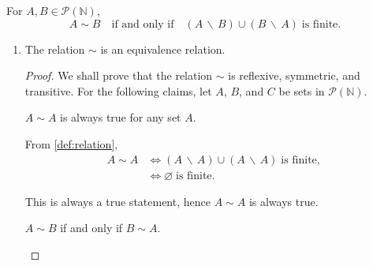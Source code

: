 \begin{enumerate}
        \smallskip

        \begin{definition} \label{def:relation}
            For $A, B \in \mathcal{P}(\mathbb{N})$,
            \[ A \sim B \quad \text{if and only if} \quad (A \, \backslash \, B) \cup (B \, \backslash \, A) \; \text{is finite}. \]
        \end{definition}

        \bigskip

        \begin{enumerate}

            \item
                \begin{proposition} \label{prop:3-a}
                    The relation $\sim$ is an equivalence relation.
                \end{proposition}

                \medskip

                \begin{proof}
                    We shall prove that the relation $\sim$ is reflexive, symmetric, and transitive.
                    For the following claims, let $A$, $B$, and $C$ be sets in $\mathcal{P}(\mathbb{N})$.

                    \begin{claim}
                        $A \sim A$ is always true for any set $A$.
                    \end{claim}

                    \medskip

                    \begin{subproof}
                        From \cref{def:relation},
                        \begin{align*}
                            A \sim A &\Longleftrightarrow (A \, \backslash \, A) \cup (A \, \backslash \, A) \; \text{is finite}, \\
                            &\Longleftrightarrow \varnothing \; \text{is finite}.
                        \end{align*}

                        This is always a true statement, hence $A \sim A$ is always true.
                    \end{subproof}

                    \medskip

                    \begin{claim}
                        $A \sim B$ if and only if $B \sim A$.
                    \end{claim}


\end{proof}
\end{enumerate}
\end{enumerate}
